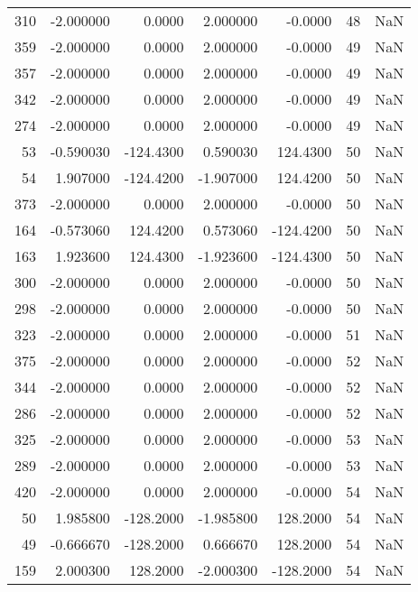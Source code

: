 \begin{tabular}{rrrrrrr}
310 &   -2.000000 &    0.0000 &    2.000000 &     -0.0000 &          48 & NaN \\
359 &   -2.000000 &    0.0000 &    2.000000 &     -0.0000 &          49 & NaN \\
357 &   -2.000000 &    0.0000 &    2.000000 &     -0.0000 &          49 & NaN \\
342 &   -2.000000 &    0.0000 &    2.000000 &     -0.0000 &          49 & NaN \\
274 &   -2.000000 &    0.0000 &    2.000000 &     -0.0000 &          49 & NaN \\
 53 &   -0.590030 & -124.4300 &    0.590030 &    124.4300 &          50 & NaN \\
 54 &    1.907000 & -124.4200 &   -1.907000 &    124.4200 &          50 & NaN \\
373 &   -2.000000 &    0.0000 &    2.000000 &     -0.0000 &          50 & NaN \\
164 &   -0.573060 &  124.4200 &    0.573060 &   -124.4200 &          50 & NaN \\
163 &    1.923600 &  124.4300 &   -1.923600 &   -124.4300 &          50 & NaN \\
300 &   -2.000000 &    0.0000 &    2.000000 &     -0.0000 &          50 & NaN \\
298 &   -2.000000 &    0.0000 &    2.000000 &     -0.0000 &          50 & NaN \\
323 &   -2.000000 &    0.0000 &    2.000000 &     -0.0000 &          51 & NaN \\
375 &   -2.000000 &    0.0000 &    2.000000 &     -0.0000 &          52 & NaN \\
344 &   -2.000000 &    0.0000 &    2.000000 &     -0.0000 &          52 & NaN \\
286 &   -2.000000 &    0.0000 &    2.000000 &     -0.0000 &          52 & NaN \\
325 &   -2.000000 &    0.0000 &    2.000000 &     -0.0000 &          53 & NaN \\
289 &   -2.000000 &    0.0000 &    2.000000 &     -0.0000 &          53 & NaN \\
420 &   -2.000000 &    0.0000 &    2.000000 &     -0.0000 &          54 & NaN \\
 50 &    1.985800 & -128.2000 &   -1.985800 &    128.2000 &          54 & NaN \\
 49 &   -0.666670 & -128.2000 &    0.666670 &    128.2000 &          54 & NaN \\
159 &    2.000300 &  128.2000 &   -2.000300 &   -128.2000 &          54 & NaN \\

\end{tabular}
